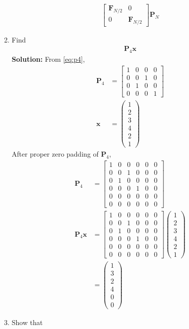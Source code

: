 \documentclass[journal,12pt,twocolumn]{IEEEtran}
\newcommand{\solution}{\noindent \textbf{Solution: }}
\let\vec\mathbf
\numberwithin{equation}{section}
\renewcommand\thesection{\arabic{section}}
\newcommand{\myvec}[1]{\ensuremath{\begin{pmatrix}#1\end{pmatrix}}}
\begin{document}
\begin{enumerate}[label=\arabic*.,ref=\thesection.\theenumi]
\begin{align}
\begin{bmatrix}
\vec{F}_{N/2} & 0 \\
0 & \vec{F}_{N/2}
\end{bmatrix}
\vec{P}_{N}
\end{align}
\item Find 
    \begin{align}
	     \vec{P}_4 \vec{x}
    \end{align}
\solution From \eqref{eq:p4},
\begin{align}
\vec{P}_4&=\begin{bmatrix}
1&0&0&0\\0&0&1&0\\0&1&0&0\\0&0&0&1
\end{bmatrix}\\
\vec{x}&=\myvec{1\\2\\3\\4\\2\\1}
\end{align}
After proper zero padding of $\vec{P}_4$,
\begin{align}
\vec{P}_4&=\begin{bmatrix}
1&0&0&0&0&0\\0&0&1&0&0&0\\0&1&0&0&0&0\\0&0&0&1&0&0\\0&0&0&0&0&0\\0&0&0&0&0&0
\end{bmatrix}\\
  \vec{P}_4 \vec{x}&=\begin{bmatrix}
1&0&0&0&0&0\\0&0&1&0&0&0\\0&1&0&0&0&0\\0&0&0&1&0&0\\0&0&0&0&0&0\\0&0&0&0&0&0
\end{bmatrix}\myvec{1\\2\\3\\4\\2\\1}\\
&=\myvec{1\\3\\2\\4\\0\\0}
\end{align}
\item Show that 

\end{enumerate}
\end{document}
